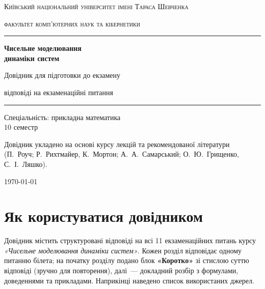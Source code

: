 \documentclass[12pt,a4paper]{article}
\theoremstyle{definition}
\theoremstyle{plain}
\begin{document}
\begin{titlepage}
\centering
\vspace*{1.5cm}
{\scshape\large Київський національний університет імені Тараса Шевченка\par}
{\scshape факультет комп'ютерних наук та кібернетики\par}
\vspace{2.6cm}
{\color{accent}\rule{\linewidth}{1.2pt}\par}
\vspace{0.6cm}
{\Huge\bfseries Чисельне моделювання\\[0.25em] динаміки систем\par}
\vspace{0.5cm}
{\LARGE Довідник для підготовки до екзамену\par}
\vspace{0.35cm}
{\large відповіді на екзаменаційні питання\par}
\vspace{0.4cm}
{\color{accent}\rule{\linewidth}{1.2pt}\par}
\vspace{2.2cm}
{\large
Спеціальність: прикладна математика\\[0.3em]
10 семестр\par}
\vfill
{\small Довідник укладено на основі курсу лекцій та рекомендованої літератури\\
(П.~Роуч; Р.~Рихтмайер, К.~Мортон; А.~А.~Самарський; О.~Ю.~Грищенко, С.~І.~Ляшко).\par}
\vspace{0.6cm}
{\small \today\par}
\end{titlepage}

\tableofcontents
\newpage

\section*{Як користуватися довідником}
\noindent
Довідник містить структуровані відповіді на всі 11 екзаменаційних питань
курсу \emph{«Чисельне моделювання динаміки систем»}. Кожен розділ
відповідає одному питанню білета; на початку розділу подано блок
\textbf{«Коротко»} зі стислою суттю відповіді (зручно для повторення),
далі~--- докладний розбір з формулами, доведеннями та прикладами.
Наприкінці наведено список використаних джерел.
\end{document}
